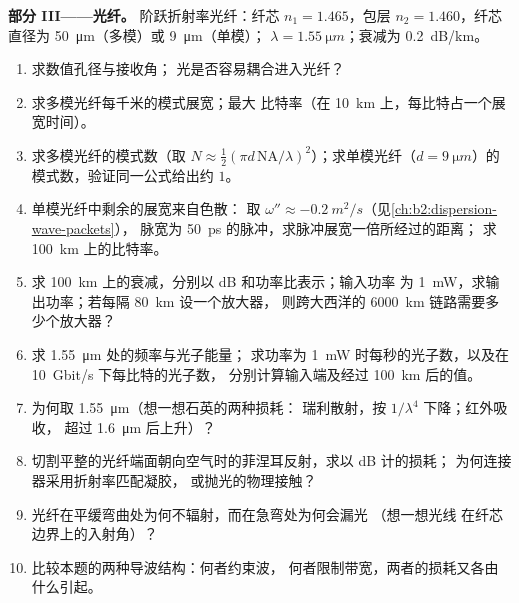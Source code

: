 \begin{problem}
\medskip
\noindent\textbf{部分 III——光纤。}
阶跃折射率光纤：纤芯 $n_1 = 1.465$，包层 $n_2 = 1.460$，纤芯
直径为 \qty{50}{\micro m}（多模）或 \qty{9}{\micro m}（单模）；
$\lambda = \qty{1.55}{\micro m}$；衰减为 \qty{0.2}{dB/km}。
\begin{enumerate}[resume]
  \item 求数值孔径与接收角；
        光是否容易耦合进入光纤？
  \item 求多模光纤每千米的模式展宽；最大
        比特率（在 \qty{10}{km} 上，每比特占一个展宽时间）。
  \item 求多模光纤的模式数（取 $N \approx
        \tfrac12(\pi d\,\mathrm{NA}/\lambda)^2$）；求单模光纤（$d =
        \qty{9}{\micro m}$）的模式数，验证同一公式给出约 $1$。
  \item 单模光纤中剩余的展宽来自色散：
        取 $\omega'' \approx \qty{-0.2}{m^2/s}$（见\cref{ch:b2:dispersion-wave-packets}），
        脉宽为 \qty{50}{ps} 的脉冲，求脉冲展宽一倍所经过的距离；
        求 \qty{100}{km} 上的比特率。
  \item 求 \qty{100}{km} 上的衰减，分别以 dB 和功率比表示；输入功率
        为 \qty{1}{mW}，求输出功率；若每隔 \qty{80}{km} 设一个放大器，
        则跨大西洋的 \qty{6000}{km} 链路需要多少个放大器？
  \item 求 \qty{1.55}{\micro m} 处的频率与光子能量；
        求功率为 \qty{1}{mW} 时每秒的光子数，以及在 \qty{10}{Gbit/s} 下每比特的光子数，
        分别计算输入端及经过 \qty{100}{km} 后的值。
  \item 为何取 \qty{1.55}{\micro m}（想一想石英的两种损耗：
        瑞利散射，按 $1/\lambda^4$ 下降；红外吸收，
        超过 \qty{1.6}{\micro m} 后上升）？
  \item 切割平整的光纤端面朝向空气时的菲涅耳反射，求以 dB 计的损耗；
        为何连接器采用折射率匹配凝胶，
        或抛光的物理接触？
  \item 光纤在平缓弯曲处为何不辐射，而在急弯处为何会漏光
        （想一想光线
        在纤芯边界上的入射角）？
  \item 比较本题的两种导波结构：何者约束波，
        何者限制带宽，两者的损耗又各由什么引起。
\end{enumerate}
\end{problem}
